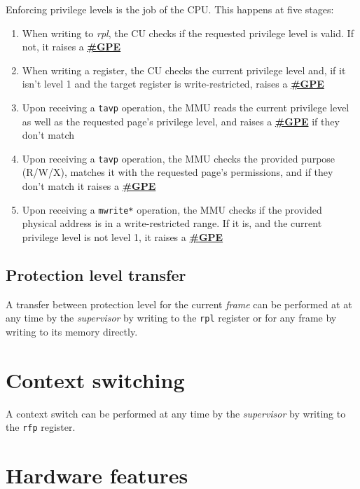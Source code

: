 \documentclass[a4paper,10pt]{article}
\begin{document}
Enforcing privilege levels is the job of the CPU. This happens at five stages:
\begin{enumerate}
	\item When writing to \emph{rpl}, the CU checks if the requested privilege level is valid. If not, it raises a \hyperref[ir:GPE]{\textbf{\#GPE}}
	\item When writing a register, the CU checks the current privilege level and, if it isn't level 1 and the target register is write-restricted, raises a \hyperref[ir:GPE]{\textbf{\#GPE}}
	\item Upon receiving a \verb|tavp| operation, the MMU reads the current privilege level as well as the requested page's privilege level, and raises a \hyperref[ir:GPE]{\textbf{\#GPE}} if they don't match
	\item Upon receiving a \verb|tavp| operation, the MMU checks the provided purpose (R/W/X), matches it with the requested page's permissions, and if they don't match it raises a \hyperref[ir:GPE]{\textbf{\#GPE}}
	\item Upon receiving a \verb|mwrite*| operation, the MMU checks if the provided physical address is in a write-restricted range. If it is, and the current privilege level is not level 1, it raises a \hyperref[ir:GPE]{\textbf{\#GPE}}
\end{enumerate}

\subsection{Protection level transfer}
A transfer between protection level for the current \emph{frame} can be performed at at any time by the \emph{supervisor} by writing to the \verb|rpl| register or for any frame by writing to its memory directly.

\section{Context switching}
A context switch can be performed at any time by the \emph{supervisor} by writing to the \verb|rfp| register.

\section{Hardware features}
\end{document}
